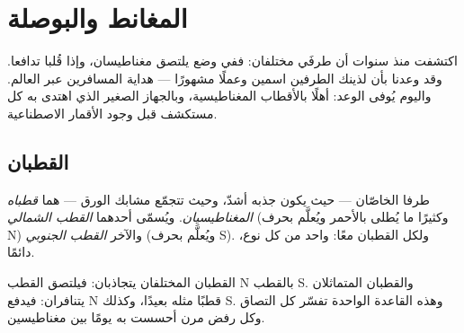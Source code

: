 \chapter{المغانط والبوصلة}\label{ch:g4:magnets-and-compass}

اكتشفت منذ سنوات أن طرفَي  مختلفان: ففي وضع يلتصق
مغناطيسان، وإذا قُلبا تدافعا. وقد وعدنا بأن لذينك الطرفين اسمين
وعملًا مشهورًا --- هداية المسافرين عبر العالم. واليوم يُوفى
الوعد: أهلًا بالأقطاب المغناطيسية، وبالجهاز الصغير الذي اهتدى به
كل مستكشف قبل وجود الأقمار الاصطناعية.

\section{القطبان}

\begin{definition}\label{def:g4:magnets-and-compass:poles}
طرفا  الخاصّان --- حيث يكون جذبه أشدّ، وحيث تتجمّع
مشابك الورق --- هما \emph{قطباه
المغناطيسيان}. ويُسمّى أحدهما \emph{القطب
الشمالي} (وكثيرًا ما يُطلى بالأحمر ويُعلَّم
بحرف N) والآخر \emph{القطب الجنوبي} (ويُعلَّم
بحرف S). ولكل  القطبان معًا: واحد من كل نوع، دائمًا.
\end{definition}

\begin{proposition}\label{prop:g4:magnets-and-compass:rule}
القطبان المختلفان يتجاذبان: فيلتصق القطب N بالقطب S. والقطبان المتماثلان
يتنافران: فيدفع N قطبًا مثله بعيدًا، وكذلك S. وهذه القاعدة
الواحدة تفسّر كل التصاق وكل رفض مرن أحسست به يومًا بين
مغناطيسين.
\end{proposition}

